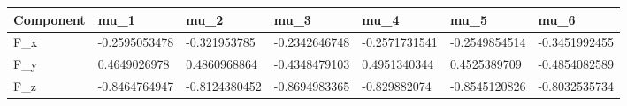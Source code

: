 \begin{tabular}{@{}lllllll@{}}
\toprule
Component & mu\_1 & mu\_2 & mu\_3 & mu\_4 & mu\_5 & mu\_6 \\
\midrule
F\_x & -0.2595053478 & -0.321953785 & -0.2342646748 & -0.2571731541 & -0.2549854514 & -0.3451992455 \\
F\_y & 0.4649026978 & 0.4860968864 & -0.4348479103 & 0.4951340344 & 0.4525389709 & -0.4854082589 \\
F\_z & -0.8464764947 & -0.8124380452 & -0.8694983365 & -0.829882074 & -0.8545120826 & -0.8032535734 \\
\bottomrule
\end{tabular}
